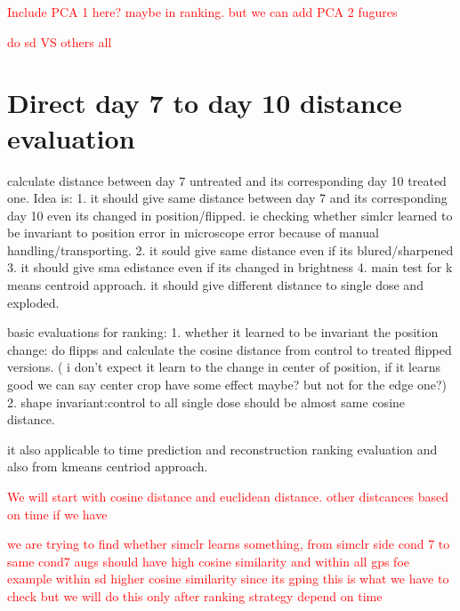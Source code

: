 \begin{table}[H]
    \centering
    \caption{Evaluation Results Using Different Distance Metrics}
    \label{tab:distance_metrics}
\end{table}



\textcolor{red}{Include PCA 1 here? maybe in ranking. but we can add PCA 2 fugures}

\textcolor{red}{do sd VS others all}


\section{Direct day 7 to day 10 distance evaluation}
calculate distance between day 7 untreated and its corresponding day 10 treated one.
Idea is:
1. it should give same distance between day 7 and its corresponding day 10
 even its changed in position/flipped. ie checking whether simlcr learned to 
 be invariant to position error in microscope error because of manual 
 handling/transporting.
2. it sould give same distance even if its blured/sharpened
3. it should give sma edistance even if its changed in brightness
4. main test for k means centroid approach. it should give different distance to single dose and exploded.


basic evaluations for ranking:
1.
whether it learned to be invariant the position change:
do flipps and calculate the cosine distance from control to treated flipped versions. ( i don't expect it learn to the change in center of position, 
if it learns good we can say center crop have some effect maybe? but not for the edge one?)
2. 
shape invariant:control to all single dose should be almost same cosine distance.

it also applicable to time prediction and reconstruction ranking evaluation and also from kmeans centriod approach.


\textcolor{red}{We will start with cosine distance and euclidean distance. other distcances based on time if we have}


\textcolor{red}{we are trying to find whether simclr learns something, from simclr side cond 7 to same cond7 augs should have high cosine similarity and within all
 gps foe example within sd higher cosine similarity since its gping this is what we have to check but we will do this only after ranking strategy depend on time}



